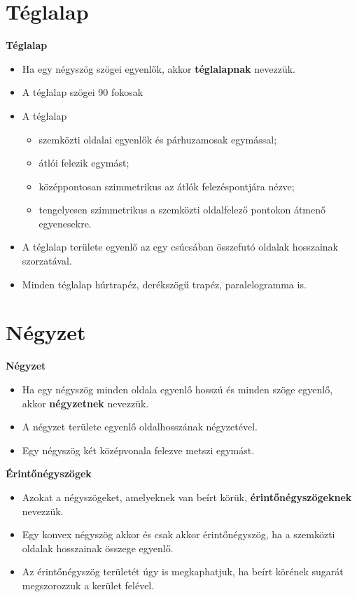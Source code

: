 \documentclass[11pt]{beamer}
\begin{document}
\section{\textbf{Téglalap}}
\begin{frame}[<+->]
\begin{block}{\textbf{Téglalap}}
\begin{itemize}[label=$\circ$]
\item Ha egy négyszög szögei egyenlők, akkor \textbf{téglalapnak} nevezzük.
\item A téglalap szögei 90 fokosak
\item A téglalap
\begin{itemize}[label=$\cdot$]
\item szemközti oldalai egyenlők és párhuzamosak egymással;
\item átlói felezik egymást;
\item középpontosan szimmetrikus az átlók felezéspontjára nézve;
\item tengelyesen szimmetrikus a szemközti oldalfelező pontokon átmenő egyenesekre.
\end{itemize}
\item A téglalap területe egyenlő az egy csúcsában összefutó oldalak hosszainak szorzatával.
\item Minden téglalap húrtrapéz, derékszögű trapéz, paralelogramma is.
\end{itemize}
\end{block}
\end{frame}

\section{\textbf{Négyzet}}
\begin{frame}[<+->]
\begin{block}{\textbf{Négyzet}}
\begin{itemize}[label=$\circ$]
\item Ha egy négyszög minden oldala egyenlő hosszú és minden szöge egyenlő, akkor \textbf{négyzetnek} nevezzük.
\item A négyzet területe egyenlő oldalhosszának négyzetével.
\item Egy négyszög két középvonala felezve metszi egymást.
\end{itemize}
\end{block}

\begin{block}{\textbf{Érintőnégyszögek}}
\begin{itemize}[label=$\circ$]
\item Azokat a négyszögeket, amelyeknek van beírt körük, \textbf{érintőnégyszögeknek} nevezzük.
\item Egy konvex négyszög akkor és csak akkor érintőnégyszög, ha a szemközti oldalak hosszainak összege egyenlő.
\item Az érintőnégyszög területét úgy is megkaphatjuk, ha beírt körének sugarát megszorozzuk a kerület felével.
\end{itemize}
\end{block}
\end{frame}
\end{document}
